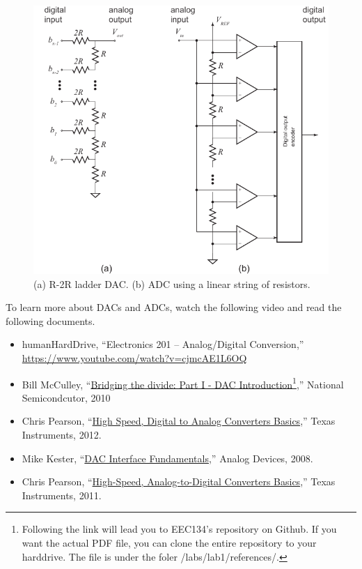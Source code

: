 \documentclass[letterpaper, 11pt]{article}
\begin{document}
\begin{figure}[h]
	\centering
	\includegraphics{dac-adc}
	\caption{(a) R-2R ladder DAC. (b) ADC using a linear string of resistors.}
	\label{fig:dac-adc}
\end{figure}


To learn more about DACs and ADCs, watch the following video and read the following documents. 

\begin{itemize}[itemsep=0.1ex]
	
	\item humanHardDrive, ``Electronics 201 -- Analog/Digital Conversion,''\\ \url{https://www.youtube.com/watch?v=cjmcAE1L6OQ}
	\item Bill McCulley, ``\href{https://github.com/ucdart/UCD-EEC134/blob/c58efc438dba2679658333c34c4a6f733f594b39/labs/lab1/references/%5BMcCulley2010%5D.DAC.Introduction.pdf}{Bridging the divide: Part I - DAC Introduction}\footnote{Following the link  will lead you to EEC134's repository on Github. If you want the actual PDF file, you can clone the entire repository to your harddrive. The file is under the foler /labs/lab1/references/.},'' National Semicondcutor, 2010
	\item Chris Pearson, ``\href{https://github.com/ucdart/UCD-EEC134/blob/e977e88aaaf67f53cd562d2a071746a38ea19aa3/labs/lab1/references/%5BPearson2012%5D.High.Speed.Analog.to.Digital.Converters.Basics.pdf}{High Speed, Digital to Analog Converters Basics},'' Texas Instruments, 2012.
	\item Mike Kester, ``\href{http://www.analog.com/media/en/training-seminars/tutorials/MT-019.pdf}{DAC Interface Fundamentals},'' Analog Devices, 2008.
	\item Chris Pearson,  ``\href{https://github.com/ucdart/UCD-EEC134/blob/da59c17c776faf159aaea506ebd87510907dc133/labs/lab1/references/%5BPearson2011%5D.High-Speed.Analog-to-Digital.Converter.Basics.pdf}{High-Speed, Analog-to-Digital Converters Basics},'' Texas Instruments, 2011.
\end{itemize}
\end{document}
